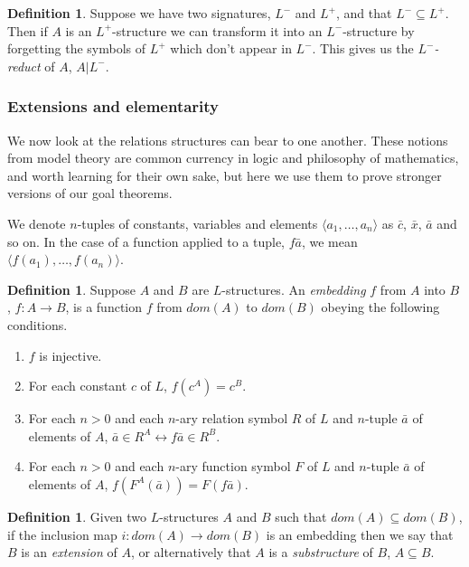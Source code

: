 \documentclass[10pt, a4paper, oneside]{article}
\theoremstyle{definition}
\newtheorem{dfn}[thm]{Definition}
\theoremstyle{remark}
\theoremstyle{plain}
\theoremstyle{plain}
\begin{document}
\begin{dfn}
    Suppose we have two signatures, $L^-$ and $L^+$, and that $L^- \subseteq
    L^+$. Then if $A$ is an $L^+$-structure we can transform it into an
    $L^-$-structure by forgetting the symbols of $L^+$ which don't appear in
    $L^-$. This gives us the \emph{$L^-$-reduct} of $A$, $A| L^-$.
\end{dfn}

\subsubsection{Extensions and elementarity}

We now look at the relations structures can bear to one another. These notions
from model theory are common currency in logic and philosophy of mathematics,
and worth learning for their own sake, but here we use them to prove stronger
versions of our goal theorems.

We denote $n$-tuples of constants, variables and elements $\langle a_1, \dotsc,
a_n \rangle$ as $\bar{c}$, $\bar{x}$, $\bar{a}$ and so on. In the case of a
function applied to a tuple, $f\bar{a}$, we mean $\langle f(a_1), \dotsc, f(a_n)
\rangle$.

\begin{dfn}
    Suppose $A$ and $B$ are $L$-structures. An \emph{embedding} $f$ from $A$
    into $B$, $f : A \rightarrow B$, is a function $f$ from $dom(A)$ to $dom(B)$
    obeying the following conditions.
    
    \begin{enumerate}
        \item $f$ is injective.
        \item For each constant $c$ of $L$, $f(c^A) = c^B$.
        \item For each $n > 0$ and each $n$-ary relation symbol $R$ of $L$ and
              $n$-tuple $\bar{a}$ of elements of $A$, $\bar{a} \in R^A
              \leftrightarrow f\bar{a} \in R^B$.
        \item For each $n > 0$ and each $n$-ary function symbol $F$ of $L$ and
              $n$-tuple $\bar{a}$ of elements of $A$, $f(F^A(\bar{a})) =
              F(f\bar{a})$.
    \end{enumerate}
\end{dfn}

\begin{dfn}
    Given two $L$-structures $A$ and $B$ such that $dom(A) \subseteq dom(B)$, if
    the inclusion map $i : dom(A) \rightarrow dom(B)$ is an embedding then we
    say that $B$ is an \emph{extension} of $A$, or alternatively that $A$ is a
    \emph{substructure} of $B$, $A \subseteq B$.
\end{dfn}
\end{document}
